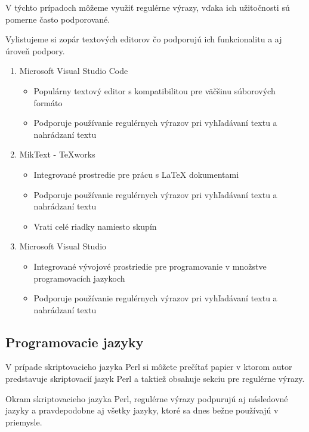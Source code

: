 \documentclass[10pt,twoside,slovak,a4paper]{article}
\begin{document}
V týchto prípadoch môžeme využiť regulérne výrazy, vďaka ich užitočnosti sú pomerne často podporované.

Vylistujeme si zopár textových editorov čo podporujú ich funkcionalitu a aj úroveň podpory.

\begin{enumerate}
	\item Microsoft Visual Studio Code
	\begin{itemize}
		\item Populárny textový editor s kompatibilitou pre väčšinu súborových formáto
		\item Podporuje používanie regulérnych výrazov pri vyhľadávaní textu a nahrádzaní textu
	\end{itemize}
	\item MikText - TeXworks
	\begin{itemize}
		\item Integrované prostredie pre prácu s LaTeX dokumentami
		\item Podporuje používanie regulérnych výrazov pri vyhľadávaní textu a nahrádzaní textu
		\item Vrati celé riadky namiesto skupín
	\end{itemize}
	\item Microsoft Visual Studio
	\begin{itemize}
		\item Integrované vývojové prostriedie pre programovanie v množstve programovacích jazykoch
		\item Podporuje používanie regulérnych výrazov pri vyhľadávaní textu a nahrádzaní textu
	\end{itemize}
\end{enumerate}


\subsection{Programovacie jazyky}
V prípade skriptovacieho jazyka Perl si môžete prečítať papier \cite{Bioperl} v ktorom autor predstavuje skriptovacií jazyk Perl a taktiež obsahuje sekciu pre regulérne výrazy.

Okram skriptovacieho jazyka Perl, regulérne výrazy podpurujú aj následovné jazyky a pravdepodobne aj všetky jazyky, ktoré sa dnes bežne používajú v priemysle.
\end{document}
